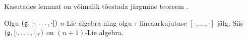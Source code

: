 Kasutades lemmat on võimalik tõestada järgmine teoreem \cite{AKMS:2014}.

\begin{thm}\label{thm:n+1_lie_alg}
    Olgu $(\mathfrak{g}, [\cdot, \dots, \cdot])$ $n$-Lie algebra ning olgu $\tau$
    lineaarkujutuse $[\cdot, \dots, \cdot]$ jälg. Siis
    $(\mathfrak{g}, [\cdot, \dots, \cdot]_\tau)$ on $(n+1)$-Lie algebra.
\end{thm}



